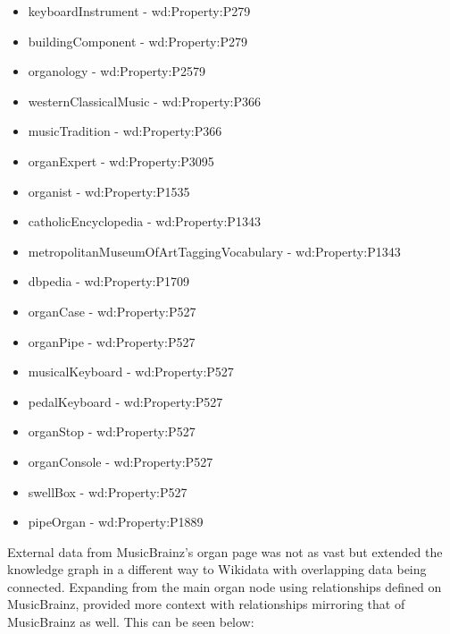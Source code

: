 \vspace{-0.15cm}
\begin{itemize}
    \itemsep0em 
    \item keyboardInstrument - wd:Property:P279
    \item buildingComponent - wd:Property:P279
    \item organology - wd:Property:P2579 
    \item westernClassicalMusic - wd:Property:P366
    \item musicTradition - wd:Property:P366
    \item organExpert - wd:Property:P3095
    \item organist - wd:Property:P1535
    \item catholicEncyclopedia - wd:Property:P1343
    \item metropolitanMuseumOfArtTaggingVocabulary - wd:Property:P1343
    \item dbpedia - wd:Property:P1709
    \item organCase - wd:Property:P527
    \item organPipe - wd:Property:P527
    \item musicalKeyboard - wd:Property:P527
    \item pedalKeyboard - wd:Property:P527
    \item organStop - wd:Property:P527
    \item organConsole - wd:Property:P527
    \item swellBox - wd:Property:P527
    \item pipeOrgan - wd:Property:P1889
\end{itemize}

External data from MusicBrainz's organ page \cite{organmusicbrainz} was not as vast but extended the knowledge graph in a different way to Wikidata with overlapping data being connected. Expanding from the main organ node using relationships defined on MusicBrainz, provided more context with relationships mirroring that of MusicBrainz as well. This can be seen below:

